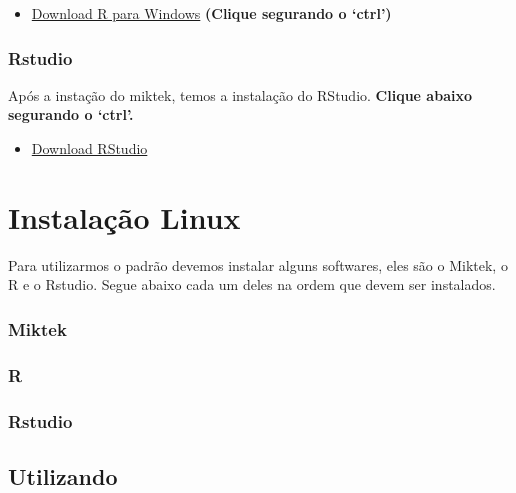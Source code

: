 \documentclass[
]{article}
\providecommand{\tightlist}{%
  \setlength{\itemsep}{0pt}\setlength{\parskip}{0pt}}
\begin{document}
\begin{itemize}
\tightlist
\item
  \href{https://cran-r.c3sl.ufpr.br/}{Download R para Windows} \textbf{(Clique segurando o `ctrl')}
\end{itemize}

\hypertarget{rstudio}{%
\subsubsection{Rstudio}\label{rstudio}}

Após a instação do miktek, temos a instalação do RStudio. \textbf{Clique abaixo segurando o `ctrl'.}

\begin{itemize}
\tightlist
\item
  \href{https://rstudio.com/products/rstudio/download/\#download}{Download RStudio}
\end{itemize}

\hypertarget{instalauxe7uxe3o-linux}{%
\section{Instalação Linux}\label{instalauxe7uxe3o-linux}}

Para utilizarmos o padrão devemos instalar alguns softwares, eles são o Miktek, o R e o Rstudio. Segue abaixo cada um deles na ordem que devem ser instalados.

\hypertarget{miktek-1}{%
\subsubsection{Miktek}\label{miktek-1}}

\hypertarget{r-1}{%
\subsubsection{R}\label{r-1}}

\hypertarget{rstudio-1}{%
\subsubsection{Rstudio}\label{rstudio-1}}

\hypertarget{utilizando}{%
\subsection{Utilizando}\label{utilizando}}

\nocite{*}

  
\end{document}
